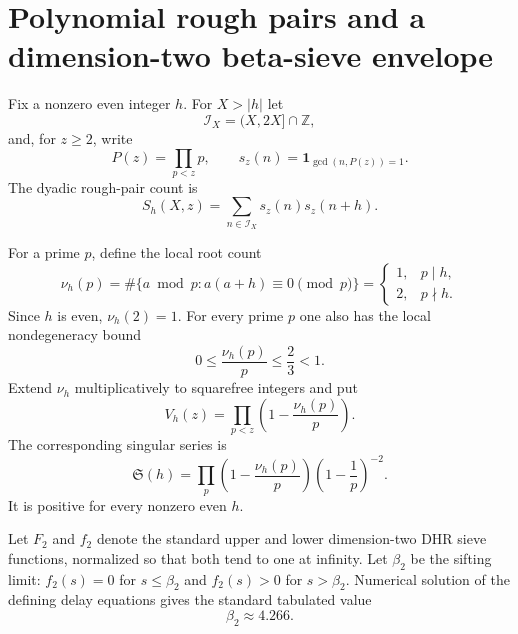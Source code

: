 \documentclass[11pt]{article}
\theoremstyle{definition}
\theoremstyle{remark}
\newcommand{\Z}{\mathbb Z}
\newcommand{\one}{\mathbf 1}
\newcommand{\cI}{\mathcal I}
\begin{document}
\section{Polynomial rough pairs and a dimension-two beta-sieve envelope}\label{sec:dhr}

Fix a nonzero even integer $h$.  For $X>|h|$ let
\begin{equation}\label{eq:dyadic-interval}
 \cI_X=(X,2X]\cap\Z,
\end{equation}
and, for $z\ge2$, write
\begin{equation}\label{eq:rough-word}
 P(z)=\prod_{p<z}p,
 \qquad
 s_z(n)=\one_{\gcd(n,P(z))=1}.
\end{equation}
The dyadic rough-pair count is
\begin{equation}\label{eq:rough-pair-count}
 S_h(X,z)=\sum_{n\in\cI_X}s_z(n)s_z(n+h).
\end{equation}

For a prime $p$, define the local root count
\begin{equation}\label{eq:local-root-count}
 \nu_h(p)=\#\{a\bmod p:a(a+h)\equiv0\pmod p\}
 =\begin{cases}
  1,&p\mid h,\\
  2,&p\nmid h.
 \end{cases}
\end{equation}
Since $h$ is even, $\nu_h(2)=1$.  For every prime $p$ one also has the local nondegeneracy bound
\begin{equation}\label{eq:local-nondegeneracy}
 0\le\frac{\nu_h(p)}p\le\frac23<1.
\end{equation}
Extend $\nu_h$ multiplicatively to squarefree integers and put
\begin{equation}\label{eq:local-sieve-product}
 V_h(z)=\prod_{p<z}\left(1-\frac{\nu_h(p)}p\right).
\end{equation}
The corresponding singular series is
\begin{equation}\label{eq:pair-singular-series}
 \mathfrak S(h)
 =\prod_p\left(1-\frac{\nu_h(p)}p\right)
          \left(1-\frac1p\right)^{-2}.
\end{equation}
It is positive for every nonzero even $h$.

Let $F_2$ and $f_2$ denote the standard upper and lower dimension-two DHR sieve functions, normalized so that both tend to one at infinity.  Let $\beta_2$ be the sifting limit: $f_2(s)=0$ for $s\le\beta_2$ and $f_2(s)>0$ for $s>\beta_2$.  Numerical solution of the defining delay equations gives the standard tabulated value
\begin{equation}\label{eq:beta-two}
 \beta_2\approx4.266.
\end{equation}
\end{document}
